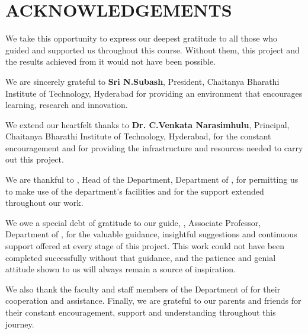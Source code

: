 \clearpage
{}
{}
\chapter*{ACKNOWLEDGEMENTS}


\noindent
\fontsize{12pt}{18pt}\selectfont We take this opportunity to express our deepest gratitude to all those who guided and supported us throughout this course. Without them, this project and the results achieved from it would not have been possible.

\noindent
We are sincerely grateful to \textbf{Sri N.Subash}, President, Chaitanya Bharathi Institute of Technology, Hyderabad for providing an environment that encourages learning, research and innovation.

\noindent
We extend our heartfelt thanks to \textbf{Dr. C.Venkata Narasimhulu}, Principal, Chaitanya Bharathi Institute of Technology, Hyderabad, for the constant encouragement and for providing the infrastructure and resources needed to carry out this project.

\noindent
We are thankful to \textbf{\depthod}, Head of the Department, Department of \thesisdept, for permitting us to make use of the department's facilities and for the support extended throughout our work.

\noindent
We owe a special debt of gratitude to our guide, \textbf{\thesisguide}, Associate Professor, Department of \thesisdept, for the valuable guidance, insightful suggestions and continuous support offered at every stage of this project. This work could not have been completed successfully without that guidance, and the patience and genial attitude shown to us will always remain a source of inspiration.

\noindent
We also thank the faculty and staff members of the Department of \thesisdept for their cooperation and assistance. Finally, we are grateful to our parents and friends for their constant encouragement, support and understanding throughout this journey.